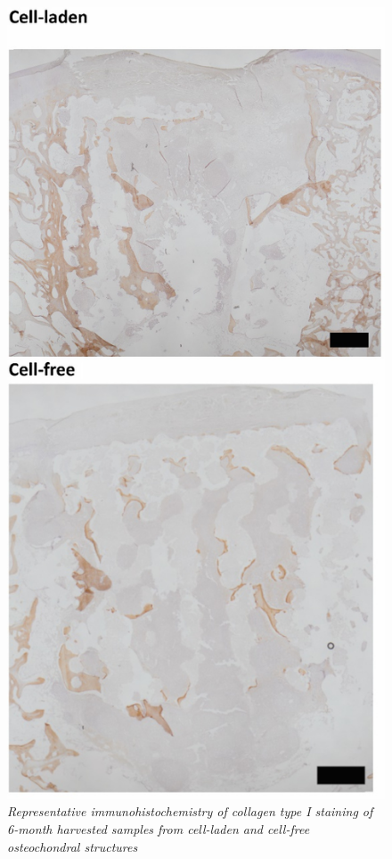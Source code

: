 \documentclass[twocolumn, serif, empirical, authordate, seplic]{jote-article}
\begin{document}
\begin{figure}
\centering \includegraphics[width=.8\columnwidth]{articles/empirical/horse/media/image16_1.jpg}
\caption{\emph{Representative immunohistochemistry of collagen type I staining of 6-month harvested samples from cell-laden and cell-free osteochondral structures}}
\label{fig:sup5}\end{figure}
\end{document}
